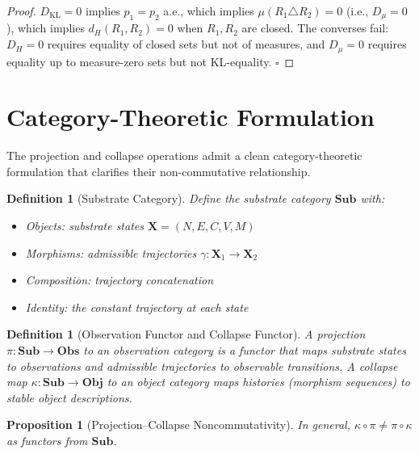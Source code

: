 \documentclass[12pt,a4paper]{article}
\newtheorem{proposition}[theorem]{Proposition}
\newtheorem{definition}[theorem]{Definition}
\begin{document}
\begin{proof}
$D_{\mathrm{KL}} = 0$ implies $p_1 = p_2$ a.e., which implies $\mu(R_1 \triangle R_2) = 0$ (i.e., $D_\mu = 0$), which implies $d_H(R_1, R_2) = 0$ when $R_1, R_2$ are closed. The converses fail: $D_H = 0$ requires equality of closed sets but not of measures, and $D_\mu = 0$ requires equality up to measure-zero sets but not KL-equality. $\square$
\end{proof}

\section{Category-Theoretic Formulation}
\label{app:category}

The projection and collapse operations admit a clean category-theoretic formulation that clarifies their non-commutative relationship.

\begin{definition}[Substrate Category]
Define the \emph{substrate category} $\mathbf{Sub}$ with:
\begin{itemize}
  \item \emph{Objects}: substrate states $\mathbf{X} = (N, E, C, V, M)$
  \item \emph{Morphisms}: admissible trajectories $\gamma: \mathbf{X}_1 \to \mathbf{X}_2$
  \item \emph{Composition}: trajectory concatenation
  \item \emph{Identity}: the constant trajectory at each state
\end{itemize}
\end{definition}

\begin{definition}[Observation Functor and Collapse Functor]
A projection $\pi: \mathbf{Sub} \to \mathbf{Obs}$ to an observation category is a functor that maps substrate states to observations and admissible trajectories to observable transitions. A collapse map $\kappa: \mathbf{Sub} \to \mathbf{Obj}$ to an object category maps histories (morphism sequences) to stable object descriptions.
\end{definition}

\begin{proposition}[Projection--Collapse Noncommutativity]
\label{prop:noncommutative}
In general, $\kappa \circ \pi \neq \pi \circ \kappa$ as functors from $\mathbf{Sub}$.
\end{proposition}
\end{document}
